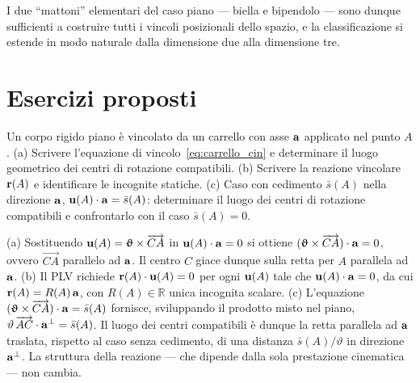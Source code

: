 \begin{oss}
	I due ``mattoni'' elementari del caso piano --- biella
	e bipendolo --- sono dunque sufficienti a costruire
	tutti i vincoli posizionali dello spazio, e la
	classificazione si estende in modo naturale dalla
	dimensione due alla dimensione tre.
\end{oss}




\section{Esercizi proposti}

\begin{esercizio}[Carrello]
	\label{ex:C04_carrello}
	
	Un corpo rigido piano è vincolato da un carrello con asse $\mathbf{a}$ applicato nel punto $A$.
	(a) Scrivere l'equazione di vincolo~\eqref{eq:carrello_cin} e determinare il luogo geometrico dei centri di rotazione compatibili.
	(b) Scrivere la reazione vincolare $\mathbf{r}(A)$ e identificare le incognite statiche.
	(c) Caso con cedimento $\bar{s}(A)$ nella direzione $\mathbf{a}$, $\mathbf{u}(A)\cdot\mathbf{a} = \bar{s}(A)$: determinare il luogo dei centri di rotazione compatibili e confrontarlo con il caso $\bar{s}(A) = 0$.
	
	\risultato (a) Sostituendo $\mathbf{u}(A) = \bm{\upvartheta} \times \overrightarrow{CA}$ in $\mathbf{u}(A)\cdot\mathbf{a} = 0$ si ottiene $(\bm{\upvartheta} \times \overrightarrow{CA})\cdot\mathbf{a} = 0$, ovvero $\overrightarrow{CA}$ parallelo ad $\mathbf{a}$. Il centro $C$ giace dunque sulla retta per $A$ parallela ad $\mathbf{a}$. (b) Il PLV richiede $\mathbf{r}(A)\cdot\mathbf{u}(A) = 0$ per ogni $\mathbf{u}(A)$ tale che $\mathbf{u}(A)\cdot\mathbf{a} = 0$, da cui $\mathbf{r}(A) = R(A)\,\mathbf{a}$, con $R(A) \in \mathbb{R}$ unica incognita scalare. (c) L'equazione $(\bm{\upvartheta} \times \overrightarrow{CA})\cdot\mathbf{a} = \bar{s}(A)$ fornisce, sviluppando il prodotto misto nel piano, $\vartheta\,\overrightarrow{AC}\cdot\mathbf{a}^{\perp} = \bar{s}(A)$. Il luogo dei centri compatibili è dunque la retta parallela ad $\mathbf{a}$ traslata, rispetto al caso senza cedimento, di una distanza $\bar{s}(A)/\vartheta$ in direzione $\mathbf{a}^{\perp}$. La struttura della reazione --- che dipende dalla sola prestazione cinematica --- non cambia.
	
\end{esercizio}

